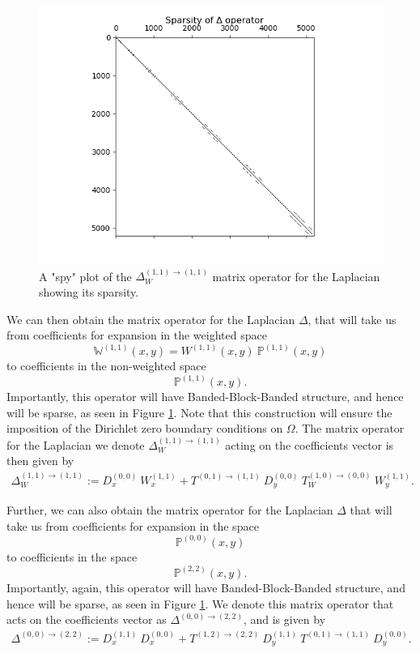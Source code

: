 \documentclass[11pt, oneside]{article}   	%
\newcommand{\bigP}{\mathbb{P}}
\newcommand{\Wii}{W^{(1,1)}}
\newcommand{\bigPii}{{\mathbb{P}^{(1,1)}}}
\newcommand{\bigPoo}{{\mathbb{P}^{(0,0)}}}
\newcommand{\laplacewii}{\Delta_W^{(1,1)\to(1,1)}}
\newcommand{\laplaceoo}{\Delta^{(0,0)\to(2,2)}}
\newcommand{\bigWii}{{\mathbb{W}^{(1,1)}}}
\begin{document}
\begin{figure}
	\centering
	\includegraphics[scale=0.4]{sparsityoflaplacian}
    	\caption{A "spy" plot of the $\laplacewii$ matrix operator for the Laplacian showing its sparsity.}
        \label{fig:sparsity}
	\centering
\end{figure}

We can then obtain the matrix operator for the Laplacian \(\Delta\), that will take us from coefficients for expansion in the weighted space
\[
\bigWii(x,y) = \Wii(x,y) \: \bigPii(x,y)
\]
to coefficients in the non-weighted space
\[
\bigPii(x,y).
\]
Importantly, this operator will have Banded-Block-Banded structure, and hence will be sparse, as seen in Figure \ref{fig:sparsity}. Note that this construction will ensure the imposition of the Dirichlet zero boundary conditions on $\Omega$. The matrix operator for the Laplacian we denote $\laplacewii$ acting on the coefficients vector is then given by
\begin{align}
    \laplacewii := D_x^{(0,0)} \: W_x^{(1,1)} + T^{(0,1)\to(1,1)} \: D_y^{(0,0)} \: T_W^{(1,0)\to(0,0)} \: W_y^{(1,1)}.
\end{align}

Further, we can also obtain the matrix operator for the Laplacian $\Delta$ that will take us from coefficients for expansion in the space
$$
\bigPoo(x,y)
$$
to coefficients in the space
$$
\bigP^{(2,2)}(x,y).
$$
Importantly, again, this operator will have Banded-Block-Banded structure, and hence will be sparse, as seen in Figure \ref{fig:sparsity}. We denote this matrix operator that acts on the coefficients vector as $\laplaceoo$, and is given by
\begin{align}
    \laplaceoo := D_x^{(1,1)} \: D_x^{(0,0)} + T^{(1,2)\to(2,2)} \: D_y^{(1,1)} \: T^{(0,1)\to(1,1)} \: D_y^{(0,0)}.
\end{align}
\end{document}
